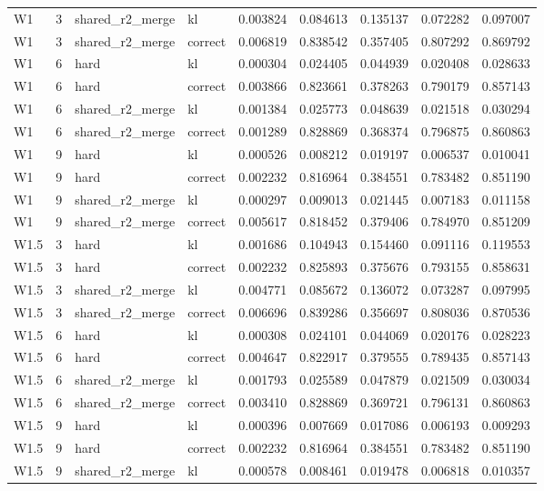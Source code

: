 \begin{tabular}{lrllrrrrr}
W1 & 3 & shared_r2_merge & kl & 0.003824 & 0.084613 & 0.135137 & 0.072282 & 0.097007 \\
W1 & 3 & shared_r2_merge & correct & 0.006819 & 0.838542 & 0.357405 & 0.807292 & 0.869792 \\
W1 & 6 & hard & kl & 0.000304 & 0.024405 & 0.044939 & 0.020408 & 0.028633 \\
W1 & 6 & hard & correct & 0.003866 & 0.823661 & 0.378263 & 0.790179 & 0.857143 \\
W1 & 6 & shared_r2_merge & kl & 0.001384 & 0.025773 & 0.048639 & 0.021518 & 0.030294 \\
W1 & 6 & shared_r2_merge & correct & 0.001289 & 0.828869 & 0.368374 & 0.796875 & 0.860863 \\
W1 & 9 & hard & kl & 0.000526 & 0.008212 & 0.019197 & 0.006537 & 0.010041 \\
W1 & 9 & hard & correct & 0.002232 & 0.816964 & 0.384551 & 0.783482 & 0.851190 \\
W1 & 9 & shared_r2_merge & kl & 0.000297 & 0.009013 & 0.021445 & 0.007183 & 0.011158 \\
W1 & 9 & shared_r2_merge & correct & 0.005617 & 0.818452 & 0.379406 & 0.784970 & 0.851209 \\
W1.5 & 3 & hard & kl & 0.001686 & 0.104943 & 0.154460 & 0.091116 & 0.119553 \\
W1.5 & 3 & hard & correct & 0.002232 & 0.825893 & 0.375676 & 0.793155 & 0.858631 \\
W1.5 & 3 & shared_r2_merge & kl & 0.004771 & 0.085672 & 0.136072 & 0.073287 & 0.097995 \\
W1.5 & 3 & shared_r2_merge & correct & 0.006696 & 0.839286 & 0.356697 & 0.808036 & 0.870536 \\
W1.5 & 6 & hard & kl & 0.000308 & 0.024101 & 0.044069 & 0.020176 & 0.028223 \\
W1.5 & 6 & hard & correct & 0.004647 & 0.822917 & 0.379555 & 0.789435 & 0.857143 \\
W1.5 & 6 & shared_r2_merge & kl & 0.001793 & 0.025589 & 0.047879 & 0.021509 & 0.030034 \\
W1.5 & 6 & shared_r2_merge & correct & 0.003410 & 0.828869 & 0.369721 & 0.796131 & 0.860863 \\
W1.5 & 9 & hard & kl & 0.000396 & 0.007669 & 0.017086 & 0.006193 & 0.009293 \\
W1.5 & 9 & hard & correct & 0.002232 & 0.816964 & 0.384551 & 0.783482 & 0.851190 \\
W1.5 & 9 & shared_r2_merge & kl & 0.000578 & 0.008461 & 0.019478 & 0.006818 & 0.010357 \\

\end{tabular}

